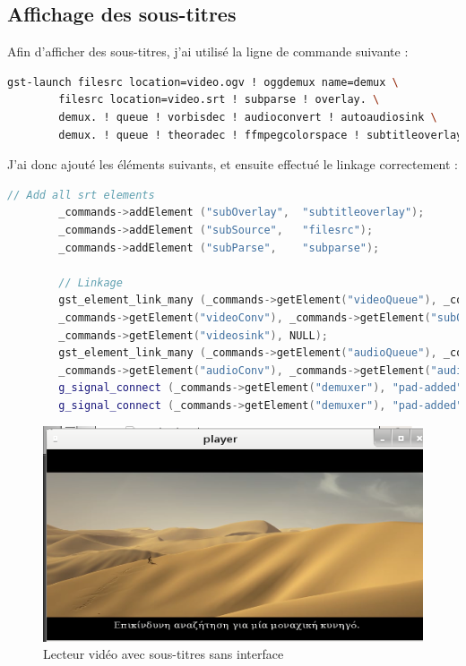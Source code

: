 \documentclass[a4paper, 11pt]{article}
\begin{document}
	\subsection{Affichage des sous-titres}
	Afin d'afficher des sous-titres, j'ai utilisé la ligne de commande suivante : 
	\begin{lstlisting}[language=sh]
		gst-launch filesrc location=video.ogv ! oggdemux name=demux \
		filesrc location=video.srt ! subparse ! overlay. \
		demux. ! queue ! vorbisdec ! audioconvert ! autoaudiosink \
		demux. ! queue ! theoradec ! ffmpegcolorspace ! subtitleoverlay name=overlay ! autovideosink;
	\end{lstlisting}

	J'ai donc ajouté les éléments suivants, et ensuite effectué le linkage correctement : 
	\begin{lstlisting}[language=C++]
		// Add all srt elements
		_commands->addElement ("subOverlay",  "subtitleoverlay");
		_commands->addElement ("subSource",   "filesrc");
		_commands->addElement ("subParse",    "subparse");

		// Linkage
		gst_element_link_many (_commands->getElement("videoQueue"), _commands->getElement("videoDecoder"),
		_commands->getElement("videoConv"), _commands->getElement("subOverlay"),
		_commands->getElement("videosink"), NULL);
		gst_element_link_many (_commands->getElement("audioQueue"), _commands->getElement("audioDecoder"),
		_commands->getElement("audioConv"), _commands->getElement("audiosink"), NULL);
		g_signal_connect (_commands->getElement("demuxer"), "pad-added", G_CALLBACK (on_pad_added), _commands->getElement("audioQueue"));
		g_signal_connect (_commands->getElement("demuxer"), "pad-added", G_CALLBACK (on_pad_added), _commands->getElement("videoQueue"));
	\end{lstlisting}

	\begin{figure}[H]
		\centering
		\includegraphics[width=14cm]{img/2.png}
		\caption{Lecteur vidéo avec sous-titres sans interface}
	\end{figure}
\end{document}

